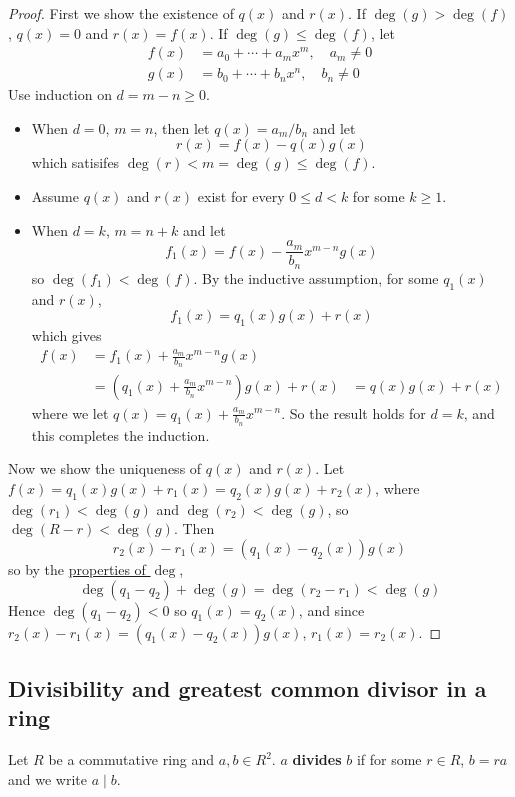\begin{proof}
	First we show the existence of $q(x)$ and $r(x)$. If $\deg(g) > \deg(f)$, $q(x) = 0$ and $r(x) = f(x)$. If $\deg(g) \le \deg(f)$, let
	\[
		\begin{aligned}
			f(x) & = a_0 + \cdots + a_m x^m, \quad a_m \ne 0 \\
			g(x) & = b_0 + \cdots + b_n x^n, \quad b_n \ne 0
		\end{aligned}
	\]
	Use induction on $d = m - n \ge 0$.
	\begin{itemize}
		\item When $d = 0$, $m = n$, then let $q(x) = a_m / b_n$ and let
		\[
			r(x) = f(x) - q(x) g(x)
		\]
		which satisifes $\deg(r) < m = \deg(g) \le \deg(f)$.
		\item Assume $q(x)$ and $r(x)$ exist for every $0 \le d < k$ for some $k \ge 1$.
		\item When $d = k$, $m = n + k$ and let
		\[
			f_1(x) = f(x) - \frac{a_m}{b_n} x^{m - n} g(x)
		\]
		so $\deg(f_1) < \deg(f)$. By the inductive assumption, for some $q_1(x)$ and $r(x)$,
		\[
			f_1(x) = q_1(x) g(x) + r(x)
		\]
		which gives
		\[
			\begin{aligned}
				f(x)
					& = f_1(x) + \frac{a_m}{b_n} x^{m - n} g(x) \\
					& = \left( q_1(x) + \frac{a_m}{b_n} x^{m - n} \right) g(x) + r(x)
					& = q(x) g(x) + r(x)
			\end{aligned}
		\]
		where we let $q(x) = q_1(x) + \frac{a_m}{b_n} x^{m - n}$. So the result holds for $d = k$, and this completes the induction.
	\end{itemize}
	Now we show the uniqueness of $q(x)$ and $r(x)$. Let $f(x) = q_1(x) g(x) + r_1(x) = q_2(x) g(x) + r_2(x)$, where $\deg(r_1) < \deg(g)$ and $\deg(r_2) < \deg(g)$, so $\deg(R - r) < \deg(g)$. Then
	\[
		r_2(x) - r_1(x) = (q_1(x) - q_2(x)) g(x)
	\]
	so by the \hyperref[def:deg]{properties of $\deg$},
	\[
		\deg(q_1 - q_2) + \deg(g) = \deg(r_2 - r_1) < \deg(g)
	\]
	Hence $\deg(q_1 - q_2) < 0$ so $q_1(x) = q_2(x)$, and since $r_2(x) - r_1(x) = (q_1(x) - q_2(x)) g(x)$, $r_1(x) = r_2(x)$.
\end{proof}

\subsection{Divisibility and greatest common divisor in a ring}

\begin{definition}
	Let $R$ be a commutative ring and $a, b \in R^2$. $a$ \textbf{divides} $b$ if for some $r \in R$, $b = ra$ and we write $a \mid b$.
\end{definition}

